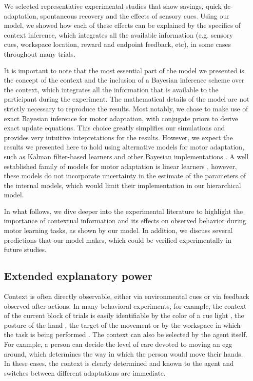 \documentclass[a4paper,doc,floatsintext,natbib]{apa6}
\begin{document}
We selected representative experimental studies that show savings, quick de-adaptation, spontaneous recovery and the effects of sensory cues. Using our model, we showed how each of these effects can be explained by the specifics of context inference, which integrates all the available information (e.g. sensory cues, workspace location, reward and endpoint feedback, etc), in some cases throughout many trials.

It is important to note that the most essential part of the model we presented is the concept of the context and the inclusion of a Bayesian inference scheme over the context, which integrates all the information that is available to the participant during the experiment. The mathematical details of the model are not strictly necessary to reproduce the results. Most notably, we chose to make use of exact Bayesian inference for motor adaptation, with conjugate priors to derive exact update equations. This choice greatly simplifies our simulations and provides very intuitive intepretations for the results. However, we expect the results we presented here to hold using alternative models for motor adaptation, such as Kalman filter-based learners \cite[e.g.][]{Oh_Minimizing_2019} and other Bayesian implementations \cite[e.g.][]{Wolpert_Multiple_1998a,Kording_Bayesian_2004}. A well established family of models for motor adaptation is linear learners \cite[e.g.][]{Smith_Interacting_2006,Forano_Timescales_2020,Lee_Dual_2009}, however, these models do not incorporate uncertainty in the estimate of the parameters of the internal models, which would limit their implementation in our hierarchical model.

In what follows, we dive deeper into the experimental literature to highlight the importance of contextual information and its effects on observed behavior during motor learning tasks, as shown by our model. In addition, we discuss several predictions that our model makes, which could be verified experimentally in future studies.

\subsection{Extended explanatory power}
Context is often directly observable, either via environmental cues or via feedback observed after actions. In many behavioral experiments, for example, the context of the current block of trials is easily identifiable by the color of a cue light \citep[e.g.][]{Ethier_Spontaneous_2008}, the posture of the hand \citep[e.g.][]{Gandolfo_Motor_1996}, the target of the movement \citep[e.g.][]{Lee_Dual_2009} or by the workspace in which the task is being performed \citep[e.g.][]{Shadmehr_Adaptive_1994}. The context can also be selected by the agent itself. For example, a person can decide the level of care devoted to moving an egg around, which determines the way in which the person would move their hands. In these cases, the context is clearly determined and known to the agent and switches between different adaptations are immediate.
\end{document}
